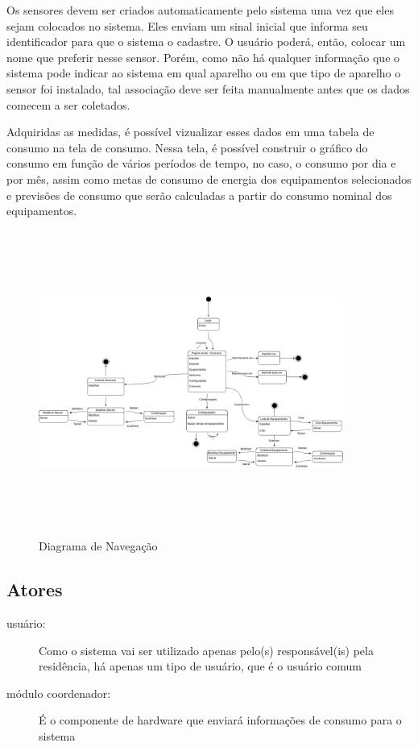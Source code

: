 Os sensores devem ser criados automaticamente pelo sistema uma vez que eles sejam colocados no sistema. Eles enviam um sinal inicial que informa seu identificador para que o sistema o cadastre. O usuário poderá, então, colocar um nome que preferir nesse sensor. Porém, como não há qualquer informação que o sistema pode indicar ao sistema em qual aparelho ou em que tipo de aparelho o sensor foi instalado, tal associação deve ser feita manualmente antes que os dados comecem a ser coletados.

Adquiridas as medidas, é possível vizualizar esses dados em uma tabela de consumo na tela de consumo. Nessa tela, é possível construir o gráfico do consumo em função de vários períodos de tempo, no caso, o consumo por dia e por mês, assim como metas de consumo de energia dos equipamentos selecionados e previsões de consumo que serão calculadas a partir do consumo nominal dos equipamentos.

\begin{figure}[H]
\begin{center}
\includegraphics[width=10cm,height=10cm,keepaspectratio]{figuras/diagrama_navegacao.png}
\caption{\label{fig:diagrama-navegacao} Diagrama de Navegação}
\end{center}
\end{figure}
%
\subsection{Atores}
\begin{description}
	\item[usuário:] Como o sistema vai ser utilizado apenas pelo(s) responsável(is) pela residência, há apenas um tipo de usuário, que é o usuário comum
    \item[módulo coordenador:] É o componente de hardware que enviará informações de consumo para o sistema
\end{description}

%
